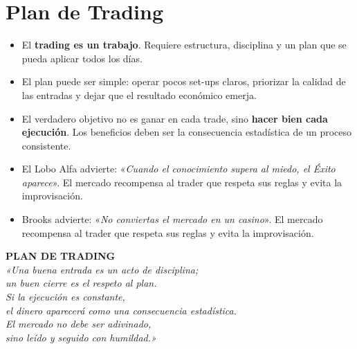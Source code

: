 
\chapter{Plan de Trading}

\begin{itemize}
\item El \textbf{trading es un trabajo}. Requiere estructura, disciplina y un plan que se pueda aplicar todos los días.
\item El plan puede ser simple: operar pocos set-ups claros, priorizar la calidad de las entradas y dejar que el resultado económico emerja.
\item El verdadero objetivo no es ganar en cada trade, sino \textbf{hacer bien cada ejecución}. Los beneficios deben ser la consecuencia estadística de un proceso consistente.
\item El Lobo Alfa \cite{ramirez18} advierte: «\textit{Cuando el conocimiento supera al miedo, el Éxito aparece}». El mercado recompensa al trader que respeta sus reglas y evita la improvisación.
\item Brooks advierte: «\textit{No conviertas el mercado en un casino}». El mercado recompensa al trader que respeta sus reglas y evita la improvisación.
\end{itemize}

\begin{center}
  \begin{minipage}{0.9\textwidth}
    \justifying
    {\LARGE \textbf{PLAN DE TRADING }}\\[2ex]
    {\itshape
    «Una buena entrada es un acto de disciplina;\\
    un buen cierre es el respeto al plan.\\
    Si la ejecución es constante,\\
    el dinero aparecerá como una consecuencia estadística.\\
    El mercado no debe ser adivinado,\\
    sino leído y seguido con humildad.»}
  \end{minipage}
\end{center}

